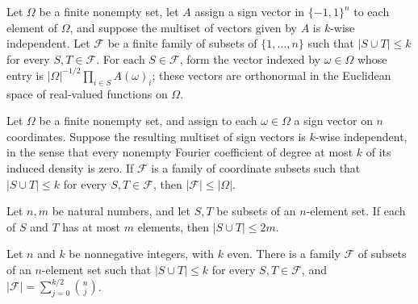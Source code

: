 \begin{theorem}
\label{FABL.normalizedRestrictedWalshVector_orthonormal}
\leanok
{}
Let $\Omega$ be a finite nonempty set, let $A$ assign a sign vector in $\{−1,1\}^n$ to
each element of $\Omega$, and suppose the multiset of vectors given by $A$ is $k$-wise
independent. Let $\mathcal F$ be a finite family of subsets of $\{1,\ldots,n\}$ such
that $|S\cup T|\le k$ for every $S,T\in\mathcal F$. For each $S\in\mathcal F$, form the
vector indexed by $\omega\in\Omega$ whose entry is $|\Omega|^{-1/2}\prod_{i\in S}
A(\omega)_i$; these vectors are orthonormal in the Euclidean space of real-valued
functions on $\Omega$.
\end{theorem}

\begin{theorem}
\label{FABL.card_frequencyFamily_le_card_of_isKWiseIndependentMultiset}
\leanok
{}
Let $\Omega$ be a finite nonempty set, and assign to each $\omega\in\Omega$ a sign
vector on $n$ coordinates. Suppose the resulting multiset of sign vectors is $k$-wise
independent, in the sense that every nonempty Fourier coefficient of degree at most $k$
of its induced density is zero. If $\mathcal F$ is a family of coordinate subsets such
that $|S\cup T|\leq k$ for every $S,T\in\mathcal F$, then $|\mathcal F|\leq|\Omega|$.
\end{theorem}

\begin{theorem}
\label{FABL.card_union_le_two_mul_of_mem_lowDegreeFourierFamily}
\leanok
{}
Let $n,m$ be natural numbers, and let $S,T$ be subsets of an $n$-element set. If each of
$S$ and $T$ has at most $m$ elements, then $|S\cup T|\le 2m$.
\end{theorem}

\begin{theorem}
\label{FABL.exists_even_kWiseFrequencyFamily}
\leanok
{}
Let $n$ and $k$ be nonnegative integers, with $k$ even. There is a family $\mathcal F$
of subsets of an $n$-element set such that $|S\cup T|\le k$ for every $S,T\in\mathcal
F$, and $|\mathcal F|=\sum_{j=0}^{k/2}\binom{n}{j}$.
\end{theorem}

